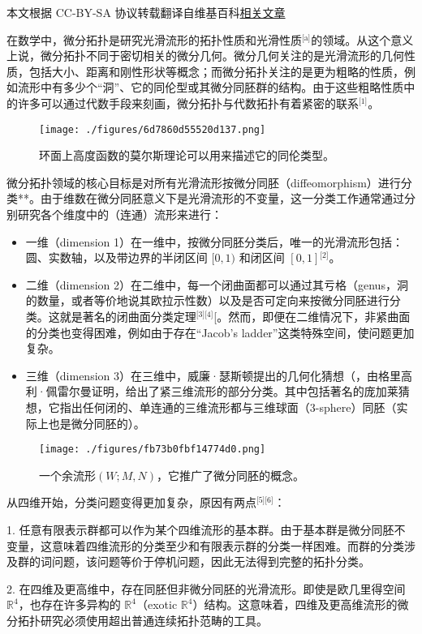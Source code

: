 
本文根据 CC-BY-SA 协议转载翻译自维基百科\href{https://en.wikipedia.org/wiki/Differential_topology}{相关文章}

在数学中，微分拓扑是研究光滑流形的拓扑性质和光滑性质\(^\text{[a]}\)的领域。从这个意义上说，微分拓扑不同于密切相关的微分几何。微分几何关注的是光滑流形的几何性质，包括大小、距离和刚性形状等概念；而微分拓扑关注的是更为粗略的性质，例如流形中有多少个“洞”、它的同伦型或其微分同胚群的结构。由于这些粗略性质中的许多可以通过代数手段来刻画，微分拓扑与代数拓扑有着紧密的联系\(^\text{[1]}\)。
\begin{figure}[ht]
\centering
\texttt{[image: ./figures/6d7860d55520d137.png]}
\caption{环面上高度函数的莫尔斯理论可以用来描述它的同伦类型。} \label{fig_WFTP_1}
\end{figure}
微分拓扑领域的核心目标是对所有光滑流形按微分同胚（diffeomorphism）进行分类**。由于维数在微分同胚意义下是光滑流形的不变量，这一分类工作通常通过分别研究各个维度中的（连通）流形来进行：
\begin{itemize}
\item 一维（dimension 1）在一维中，按微分同胚分类后，唯一的光滑流形包括：圆、实数轴，以及带边界的半闭区间 $[0,1)$ 和闭区间 $[0,1]$\(^\text{[2]}\)。
\item 二维（dimension 2）在二维中，每一个闭曲面都可以通过其亏格（genus，洞的数量，或者等价地说其欧拉示性数）以及是否可定向来按微分同胚进行分类。这就是著名的闭曲面分类定理\(^\text{[3][4]}\)[。然而，即便在二维情况下，非紧曲面的分类也变得困难，例如由于存在“Jacob's ladder”这类特殊空间，使问题更加复杂。
\item 三维（dimension 3）在三维中，威廉·瑟斯顿提出的几何化猜想（，由格里高利·佩雷尔曼证明，给出了紧三维流形的部分分类。其中包括著名的庞加莱猜想，它指出任何闭的、单连通的三维流形都与三维球面（3-sphere）同胚（实际上也是微分同胚的）。
\end{itemize}
\begin{figure}[ht]
\centering
\texttt{[image: ./figures/fb73b0fbf14774d0.png]}
\caption{一个余流形$(W; M, N)$，它推广了微分同胚的概念。} \label{fig_WFTP_2}
\end{figure}
从四维开始，分类问题变得更加复杂，原因有两点\(^\text{[5][6]}\)：

1. 任意有限表示群都可以作为某个四维流形的基本群。由于基本群是微分同胚不变量，这意味着四维流形的分类至少和有限表示群的分类一样困难。而群的分类涉及群的词问题，该问题等价于停机问题，因此无法得到完整的拓扑分类。

2. 在四维及更高维中，存在同胚但非微分同胚的光滑流形。即使是欧几里得空间 $\mathbb{R}^4$，也存在许多异构的 $\mathbb{R}^4$（exotic $\mathbb{R}^4$）结构。这意味着，四维及更高维流形的微分拓扑研究必须使用超出普通连续拓扑范畴的工具。

